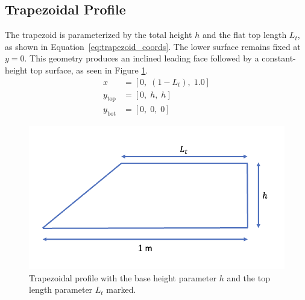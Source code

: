 \documentclass[11pt]{article}
\begin{document}
\subsection{Trapezoidal Profile}
The trapezoid is parameterized by the total height $h$ and the flat top length $L_t$, as shown in Equation~\ref{eq:trapezoid_coords}. The lower surface remains fixed at $y = 0$. This geometry produces an inclined leading face followed by a constant-height top surface, as seen in Figure \ref{fig:trapezoid}.
\begin{subequations} \label{eq:trapezoid_coords}
\begin{align}
x &= [0,\; (1 - L_t),\; 1.0] \label{eq:trapezoid_x}\\
y_{\text{top}} &= [0,\; h,\; h] \label{eq:trapezoid_top}\\
y_{\text{bot}} &= [0,\; 0,\; 0] \label{eq:trapezoid_bot}
\end{align}
\end{subequations}
\begin{figure}[H]
\centering
    \includegraphics[width=0.5\linewidth]{trapezoid.png}
    \caption{Trapezoidal profile with the base height parameter $h$ and the top length parameter $L_t$ marked.}
\label{fig:trapezoid}
\end{figure}
\end{document}
